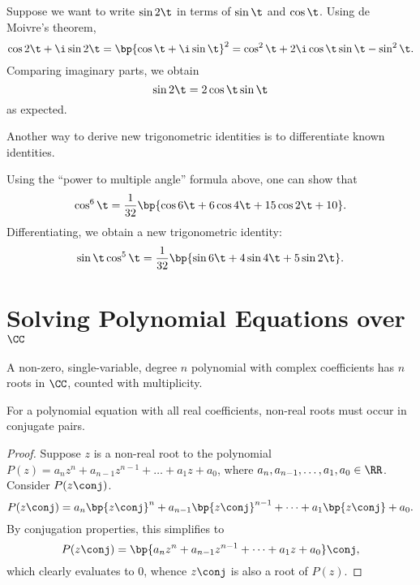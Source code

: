 \begin{example}
    Suppose we want to write $\sin 2\t$ in terms of $\sin \t$ and $\cos \t$. Using de Moivre's theorem, \[\cos 2\t + \i \sin 2\t = \bp{\cos \t + \i \sin \t}^2 = \cos^2 \t + 2\i \cos \t \sin \t - \sin^2 \t.\] Comparing imaginary parts, we obtain \[\sin 2\t = 2\cos\t\sin\t\] as expected.
\end{example}

Another way to derive new trigonometric identities is to differentiate known identities.

\begin{example}
    Using the ``power to multiple angle'' formula above, one can show that \[\cos^6 \t = \frac1{32} \bp{\cos 6\t + 6\cos4\t + 15\cos2\t + 10}.\] Differentiating, we obtain a new trigonometric identity: \[\sin \t \cos^5 \t = \frac1{32} \bp{\sin 6\t + 4\sin 4\t + 5\sin 2\t}.\]
\end{example}

\section{Solving Polynomial Equations over $\CC$}

\begin{theorem}
    A non-zero, single-variable, degree $n$ polynomial with complex coefficients has $n$ roots in $\CC$, counted with multiplicity.
\end{theorem}

\begin{theorem}
    For a polynomial equation with all real coefficients, non-real roots must occur in conjugate pairs.
\end{theorem}
\begin{proof}
    Suppose $z$ is a non-real root to the polynomial $P(z) = a_n z^n + a_{n-1} z^{n-1} + \dots + a_1 z + a_0$, where $a_n, a_{n-1}, \dots, a_1, a_0 \in \RR$. Consider $P(z\conj)$. \[P(z\conj) = a_n \bp{z\conj}^n + a_{n-1} \bp{z\conj}^{n-1} + \dots + a_1 \bp{z\conj} + a_0.\] By conjugation properties, this simplifies to \[P(z\conj) = \bp{a_n z^n + a_{n-1} z^{n-1} + \dots + a_1 z + a_0}\conj,\] which clearly evaluates to 0, whence $z\conj$ is also a root of $P(z)$.
\end{proof}